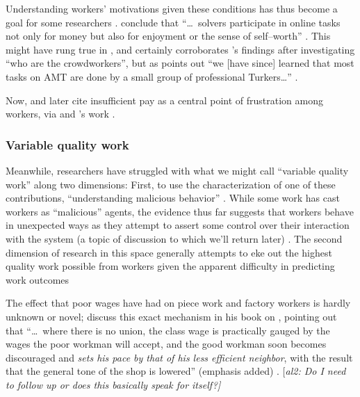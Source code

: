 \documentclass{sigchi}
\newcommand{\ali}[1]{{\color{BrickRed}[\itshape al2: #1\upshape]}}
\begin{document}
Understanding workers' motivations given these conditions has thus become a goal for some researchers
\cite{whyWouldAnyoneBrewer}.
\citeauthor{Sun20111033} conclude that
``\dots~solvers participate in online tasks
not only for money
but also for enjoyment
or the sense of self--worth''
\cite{Sun20111033}.
This might have rung true in \citeyear{Sun20111033},
and certainly corroborates \citeauthor{Ross}'s findings after investigating
``who are the crowdworkers'',
but as \citeauthor{whoareNOTtheTurkers} points out
``we [have since] learned that most tasks on AMT are done by a small group of professional Turkers\dots''
\cite{Ross,whoareNOTtheTurkers}.

Now, \citeauthor{turkopticon}
and later
\citeauthor{dynamo} cite insufficient pay as a central point of frustration among workers,
via \citeauthor{irani2015cultural} and \citeauthor{dawnDigitalSweatshopCushing}'s work
\cite{dynamo,irani2015cultural,dawnDigitalSweatshopCushing,turkopticon}.


\subsubsection{Variable quality work}\label{sec:varQualWork}
Meanwhile,
researchers have struggled with what we might call ``variable quality work''
along two dimensions:
First, to use the characterization of one of these contributions,
``understanding malicious behavior''
\cite{MaliciousCrowdworkersGadiraju}.
While some work has cast workers as ``malicious'' agents,
the evidence thus far suggests that
workers behave in unexpected ways as they attempt to assert some control over their interaction with the system
(a topic of discussion to which we'll return later)
\cite{uberAlgorithm}.
The second dimension of research in this space generally attempts
to eke out the highest quality work possible from workers
given the apparent difficulty in predicting work outcomes





The effect that poor wages have had on piece work and factory workers is hardly unknown or novel;
\citeauthor{gantt1913work} discuss this exact mechanism in his book on
, pointing out that
``\dots~where there is no union,
the class wage is practically gauged by the wages the poor workman will accept,
and the good workman soon becomes discouraged and \textit{sets his pace by that of his less efficient neighbor},
with the result that the general tone of the shop is lowered'' (emphasis added)
\cite{gantt1913work}.
\ali{Do I need to follow up or does this basically speak for itself?}
\end{document}
